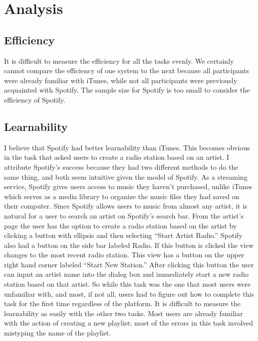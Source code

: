 \documentclass[11pt]{article}
\begin{document}
\section{Analysis}
\subsection{Efficiency}
It is difficult to measure the efficiency for all the tasks evenly. We certainly cannot compare the efficiency of one system to the next because all participants were already familiar with iTunes, while not all participants were previously acquainted with Spotify. The sample size for Spotify is too small to consider the efficiency of Spotify.
\subsection{Learnability}
I believe that Spotify had better learnability than iTunes.
This becomes obvious in the task that asked users to create a radio station based on an artist. I attribute Spotify's success because they had two different methods to do the same thing, and both seem intuitive given the model of Spotify. As a streaming service, Spotify gives users access to music they haven't purchased, unlike iTunes which serves as a media library to organize the music files they had saved on their computer. Since Spotify allows users to music from almost any artist, it is natural for a user to search an artist on Spotify's search bar. From the artist's page the user has the option to create a radio station based on the artist by clicking a button with ellipsis and then selecting ``Start Artist Radio.'' Spotify also had a button on the side bar labeled Radio. If this button is clicked the view changes to the most recent radio station. This view has a button on the upper right hand corner labeled ``Start New Station.'' After clicking this button the user can input an artist name into the dialog box and immediately start a new radio station based on that artist. So while this task was the one that most users were unfamiliar with, and most, if not all, users had to figure out how to complete this task for the first time regardless of the platform. It is difficult to measure the learnability as easily with the other two tasks. Most users are already familiar with the action of creating a new playlist; most of the errors in this task involved mistyping the name of the playlist. 
\end{document}
